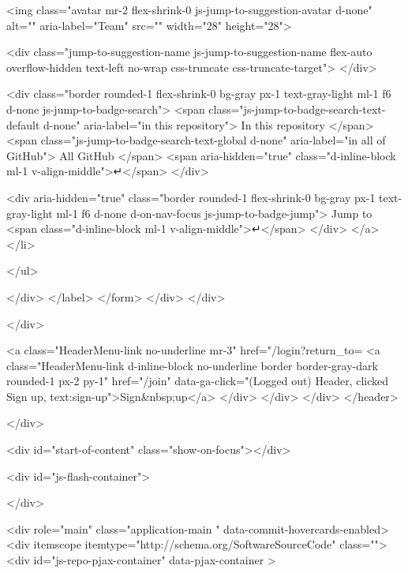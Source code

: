     <img class="avatar mr-2 flex-shrink-0 js-jump-to-suggestion-avatar d-none" alt="" aria-label="Team" src="" width="28" height="28">

    <div class="jump-to-suggestion-name js-jump-to-suggestion-name flex-auto overflow-hidden text-left no-wrap css-truncate css-truncate-target">
    </div>

    <div class="border rounded-1 flex-shrink-0 bg-gray px-1 text-gray-light ml-1 f6 d-none js-jump-to-badge-search">
      <span class="js-jump-to-badge-search-text-default d-none" aria-label="in this repository">
        In this repository
      </span>
      <span class="js-jump-to-badge-search-text-global d-none" aria-label="in all of GitHub">
        All GitHub
      </span>
      <span aria-hidden="true" class="d-inline-block ml-1 v-align-middle">↵</span>
    </div>

    <div aria-hidden="true" class="border rounded-1 flex-shrink-0 bg-gray px-1 text-gray-light ml-1 f6 d-none d-on-nav-focus js-jump-to-badge-jump">
      Jump to
      <span class="d-inline-block ml-1 v-align-middle">↵</span>
    </div>
  </a>
</li>


</ul>

            </div>
      </label>
</form>  </div>
</div>

          </div>

        <a class="HeaderMenu-link no-underline mr-3" href="/login?return_to=%
          <a class="HeaderMenu-link d-inline-block no-underline border border-gray-dark rounded-1 px-2 py-1" href="/join" data-ga-click="(Logged out) Header, clicked Sign up, text:sign-up">Sign&nbsp;up</a>
      </div>
    </div>
  </div>
</header>

  </div>

  <div id="start-of-content" class="show-on-focus"></div>

    <div id="js-flash-container">

</div>



  <div role="main" class="application-main " data-commit-hovercards-enabled>
        <div itemscope itemtype="http://schema.org/SoftwareSourceCode" class="">
    <div id="js-repo-pjax-container" data-pjax-container >
      


  




